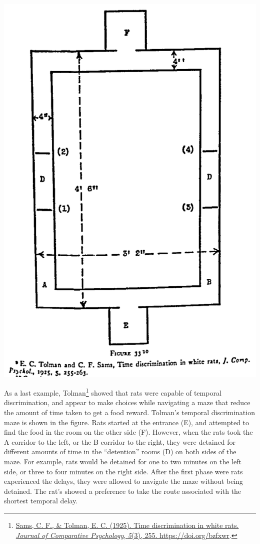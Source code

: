 \documentclass[
  oneside,
  12pt]{crumpbook}
\newenvironment{floatrightbox50}{%
  \wrapfigure{R}{.5\textwidth}%
  }{%
  \endwrapfigure}
\begin{document}
\begin{floatrightbox50}
\includegraphics[width=1\linewidth]{imgs/Tolman_Temporal}

\end{floatrightbox50}

As a last example, Tolman\footnote{\protect\hyperlink{ref-samsTimeDiscriminationWhite1925}{Sams, C. F., \& Tolman, E. C. (1925). Time discrimination in white rats. \emph{Journal of Comparative Psychology}, \emph{5}(3), 255. \url{https://doi.org/bzfxwr}}.} showed that rats were capable of temporal discrimination, and appear to make choices while navigating a maze that reduce the amount of time taken to get a food reward. Tolman's temporal discrimination maze is shown in the figure. Rats started at the entrance (E), and attempted to find the food in the room on the other side (F). However, when the rats took the A corridor to the left, or the B corridor to the right, they were detained for different amounts of time in the ``detention'' rooms (D) on both sides of the maze. For example, rats would be detained for one to two minutes on the left side, or three to four minutes on the right side. After the first phase were rats experienced the delays, they were allowed to navigate the maze without being detained. The rat's showed a preference to take the route associated with the shortest temporal delay.
\end{document}
